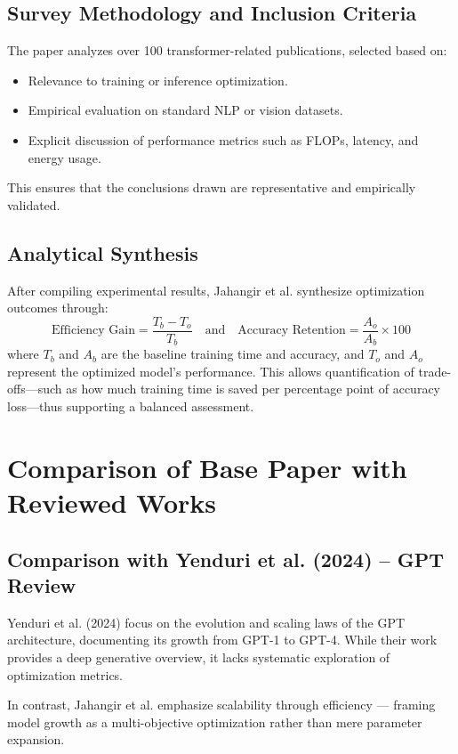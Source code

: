 \subsection{Survey Methodology and Inclusion Criteria}
The paper analyzes over 100 transformer-related publications, selected based on:
\begin{itemize}
    \item Relevance to training or inference optimization.
    \item Empirical evaluation on standard NLP or vision datasets.
    \item Explicit discussion of performance metrics such as FLOPs, latency, and energy usage.
\end{itemize}
This ensures that the conclusions drawn are representative and empirically validated.

\subsection{Analytical Synthesis}
After compiling experimental results, Jahangir et al. synthesize optimization outcomes through:
\[
\text{Efficiency Gain} = \frac{T_b - T_o}{T_b}
\quad \text{and} \quad
\text{Accuracy Retention} = \frac{A_o}{A_b} \times 100
\]
where \(T_b\) and \(A_b\) are the baseline training time and accuracy, and \(T_o\) and \(A_o\) represent the optimized model’s performance.  
This allows quantification of trade-offs—such as how much training time is saved per percentage point of accuracy loss—thus supporting a balanced assessment.

\newpage
\section{Comparison of Base Paper with Reviewed Works}

\subsection{Comparison with Yenduri et al. (2024) – GPT Review}
Yenduri et al. (2024) focus on the evolution and scaling laws of the GPT architecture, documenting its growth from GPT-1 to GPT-4.  
While their work provides a deep generative overview, it lacks systematic exploration of optimization metrics.

In contrast, Jahangir et al. emphasize scalability through efficiency — framing model growth as a multi-objective optimization rather than mere parameter expansion.

